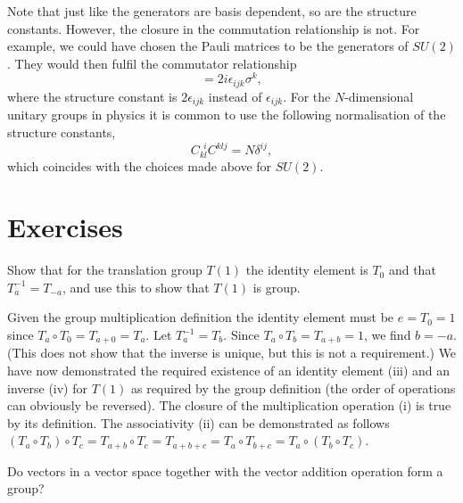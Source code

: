 \documentclass[notes.tex]{subfiles}
\begin{document}
Note that just like the generators are basis dependent, so are the structure constants. However, the closure in the commutation relationship is not. For example, we could have chosen the Pauli matrices to be the generators of $SU(2)$. They would then fulfil the commutator relationship
\begin{equation*}
[\sigma_i,\sigma_j]=2i\epsilon_{ijk}\sigma^k, 
\label{eq:pauli_algebra}
\end{equation*}
where the structure constant is $2\epsilon_{ijk}$ instead of $\epsilon_{ijk}$. For the $N$-dimensional unitary groups in physics it is common to use the following normalisation of the structure constants,
\begin{equation}
C_{kl}^{~~i}C_{}^{klj}=N\delta^{ij},
\label{eq:generator_normalisation}
\end{equation}
which coincides with the choices made above for $SU(2)$.



\section{Exercises}

\begin{Exercise}[]
Show that for the translation group $T(1)$ the identity element is $T_0$ and that $T_a^{-1} = T_{-a}$, and use this to show that $T(1)$ is group.
\end{Exercise}

\begin{Answer}
Given the group multiplication definition the identity element must be $e=T_0=1$ since $T_a\circ T_0=T_{a+0}=T_a$. Let $T_a^{-1} =T_b$. Since $T_a \circ T_b=T_{a+b}=1$, we find $b=-a$. (This does not show that the inverse is unique, but this is not a requirement.) We have now demonstrated the required existence of an identity element (iii) and an inverse (iv) for $T(1)$ as required by the group definition (the order of operations can obviously be reversed). The closure of the multiplication operation (i) is true by its definition. The associativity (ii) can be demonstrated as follows $(T_a\circ T_b)\circ T_c=T_{a+b}\circ T_c=T_{a+b+c}=T_{a}\circ T_{b+c}=T_a\circ (T_b\circ T_c)$.
\end{Answer}


\begin{Exercise}[]
Do vectors in a vector space together with the vector addition operation form a group?
\end{Exercise}
\end{document}
